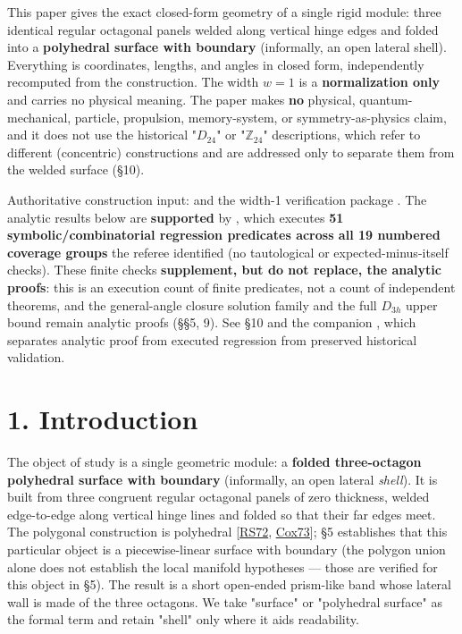 \documentclass[
  11pt,
  a4paper,
]{article}
\begin{document}
This paper gives the exact closed-form geometry of a single rigid module: three identical regular octagonal panels welded along vertical hinge edges and folded into a \textbf{polyhedral surface with boundary} (informally, an open lateral shell). Everything is coordinates, lengths, and angles in closed form, independently recomputed from the construction. The width \(w=1\) is a \textbf{normalization only} and carries no physical meaning. The paper makes \textbf{no} physical, quantum-mechanical, particle, propulsion, memory-system, or symmetry-as-physics claim, and it does not use the historical "\(D_{24}\)" or "\(\mathbb Z_{24}\)" descriptions, which refer to different (concentric) constructions and are addressed only to separate them from the welded surface (§10).

Authoritative construction input:  and the width-1 verification package . The analytic results below are \textbf{supported} by , which executes \textbf{51 symbolic/combinatorial regression predicates across all 19 numbered coverage groups} the referee identified (no tautological or expected-minus-itself checks). These finite checks \textbf{supplement, but do not replace, the analytic proofs}: this is an execution count of finite predicates, not a count of independent theorems, and the general-angle closure solution family and the full \(D_{3h}\) upper bound remain analytic proofs (§§5, 9). See §10 and the companion , which separates analytic proof from executed regression from preserved historical validation.

\section{1. Introduction}\label{introduction}

The object of study is a single geometric module: a \textbf{folded three-octagon polyhedral surface with boundary} (informally, an open lateral \emph{shell}). It is built from three congruent regular octagonal panels of zero thickness, welded edge-to-edge along vertical hinge lines and folded so that their far edges meet. The polygonal construction is polyhedral {[}\hyperlink{ref-RS72}{RS72}, \hyperlink{ref-Cox73}{Cox73}{]}; §5 establishes that this particular object is a piecewise-linear surface with boundary (the polygon union alone does not establish the local manifold hypotheses --- those are verified for this object in §5). The result is a short open-ended prism-like band whose lateral wall is made of the three octagons. We take "surface" or "polyhedral surface" as the formal term and retain "shell" only where it aids readability.
\end{document}

